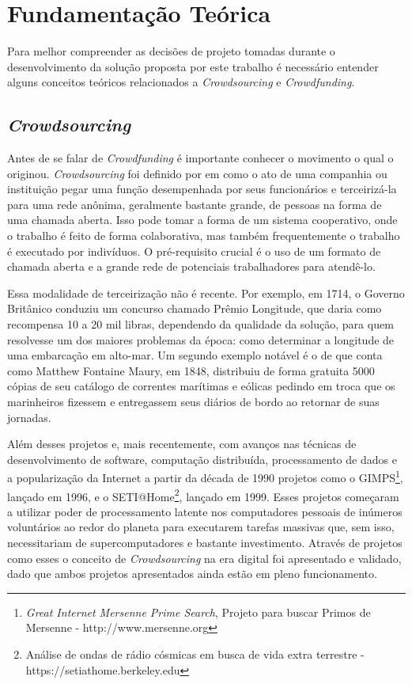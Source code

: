\chapter{Fundamentação Teórica} \label{cha:fundamentacao}

Para melhor compreender as decisões de projeto tomadas durante o desenvolvimento da solução proposta por este trabalho é necessário entender alguns conceitos teóricos relacionados a \emph{Crowdsourcing} e \emph{Crowdfunding}.

\section{\emph{Crowdsourcing}} \label{sec:fundamentacao:crowdsourcing}
Antes de se falar de \emph{Crowdfunding} é importante conhecer o movimento o qual o originou. \emph{Crowdsourcing} foi definido por \citeauthor{wired-crowdsource} em \citeyear{wired-crowdsource} como o ato de uma companhia ou instituição pegar uma função desempenhada por seus funcionários e terceirizá-la para uma rede anônima, geralmente bastante grande, de pessoas na forma de uma chamada aberta. Isso pode tomar a forma de um sistema cooperativo, onde o trabalho é feito de forma colaborativa, mas também frequentemente o trabalho é executado por indivíduos. O pré-requisito crucial é o uso de um formato de chamada aberta e a grande rede de potenciais trabalhadores para atendê-lo.

Essa modalidade de terceirização não é recente. Por exemplo, em 1714, o Governo Britânico conduziu um concurso chamado Prêmio Longitude\cite{wiki-longitude_rewards}, que daria como recompensa 10 a 20 mil libras, dependendo da qualidade da solução, para quem resolvesse um dos maiores problemas da época: como determinar a longitude de uma embarcação em alto-mar. Um segundo exemplo notável é o de \citeauthor{hearn2002tracks} que conta como Matthew Fontaine Maury, em 1848, distribuiu de forma gratuita 5000 cópias de seu catálogo de correntes marítimas e eólicas pedindo em troca que os marinheiros fizessem e entregassem seus diários de bordo ao retornar de suas jornadas.

Além desses projetos e, mais recentemente, com avanços nas técnicas de desenvolvimento de software, computação distribuída, processamento de dados e a popularização da Internet a partir da década de 1990 projetos como o GIMPS\footnote{\emph{Great Internet Mersenne Prime Search}, Projeto para buscar Primos de Mersenne - http://www.mersenne.org}, lançado em 1996, e o SETI@Home\footnote{Análise de ondas de rádio cósmicas em busca de vida extra terrestre - https://setiathome.berkeley.edu}, lançado em 1999. Esses projetos começaram a utilizar poder de processamento latente nos computadores pessoais de inúmeros voluntários ao redor do planeta para executarem tarefas massivas que, sem isso, necessitariam de supercomputadores e bastante investimento. Através de projetos como esses o conceito de \emph{Crowdsourcing} na era digital foi apresentado e validado, dado que ambos projetos apresentados ainda estão em pleno funcionamento.

